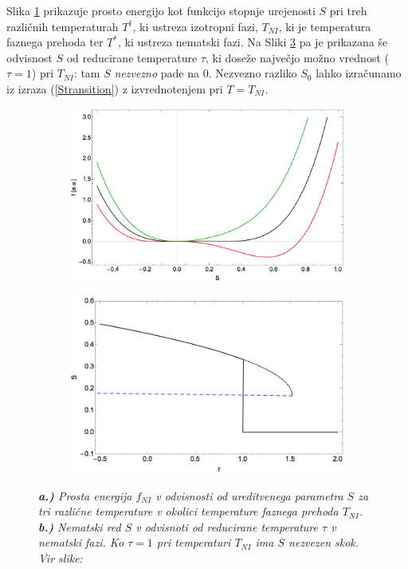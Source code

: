 \documentclass[longbibliography,slovene,a4paper,12pt]{book}
\begin{document}
Slika \ref{fig:landau_F} prikazuje prosto energijo kot funkcijo stopnje urejenosti $S$ pri treh različnih temperaturah $T^{\dag}$, ki ustreza izotropni fazi, $T_{NI}$, ki je temperatura faznega prehoda ter $T^*$, ki ustreza nematski fazi. Na Sliki \ref{fig:landau_S} pa je prikazana še odvisnost $S$ od reducirane temperature $\tau$, ki doseže največjo možno vrednost ($\tau = 1$) pri $T_{NI}$: tam $S$ \emph{nezvezno} pade na 0\cite{gramsbergen}. Nezvezno razliko $S_0$ lahko izračunamo iz izraza (\ref{Stransition}) z izvrednotenjem pri $T= T_{NI}$.

\begin{figure}[h!]
	\centering
	\begin{subfigure}[b]{0.45\textwidth}
	\includegraphics[width=\textwidth]{slike/landau_PT_F_my.png}
	\label{fig:landau_F}
	\end{subfigure}
	\begin{subfigure}[b]{0.45\textwidth}
	\includegraphics[width=\textwidth]{slike/landau_PT_S_my.png}
	\label{fig:landau_S}
	\end{subfigure}
	\caption{\emph{\textbf{a.)} Prosta energija $f_{NI}$ v odvisnosti od ureditvenega parametra $S$ za tri različne temperature v okolici temperature faznega prehoda $T_{NI}$. \textbf{b.)} Nematski red $S$ v odvisnoti od reducirane temperature $\tau$ v nematski fazi. Ko $\tau = 1$ pri temperaturi $T_{NI}$ ima $S$ nezvezen skok. Vir slike:\cite{gramsbergen}}}
\end{figure} 
\end{document}
